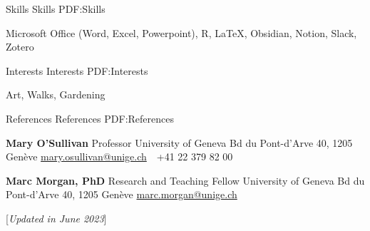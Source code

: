\documentclass[letterpaper,MMMyyyy,nonstopmode]{simpleresumecv}
\newcommand{\CVNote}{Updated in June 2023}
\begin{document}
\begin{Body}
\Section
{Skills}
{Skills}
{PDF:Skills}

\Entry
Microsoft Office (Word, Excel, Powerpoint), R, LaTeX, Obsidian, Notion, Slack, Zotero


\Section
{Interests}
{Interests}
{PDF:Interests}

\Entry
Art, Walks, Gardening




\Section
{References}
{References}
{PDF:References}

\BulletItem
\textbf{Mary O'Sullivan}
\newline
Professor
\newline
University of Geneva
\newline
Bd du Pont-d'Arve 40, 1205 Genève
\newline
\href{mailto:mary.osullivan@unige.ch}
{mary.osullivan@unige.ch}
\,\SubBulletSymbol\,
+41 22 379 82 00

\BigGap
\BulletItem
\textbf{Marc Morgan, PhD}
\newline
Research and Teaching Fellow
\newline
University of Geneva
\newline
Bd du Pont-d'Arve 40, 1205 Genève
\newline
\href{marc.morgan@unige.ch}
{marc.morgan@unige.ch}

\end{Body}


\BigGap
\UseNoteFont%
\null\hfill%
[\textit{\CVNote}]
\end{document}
